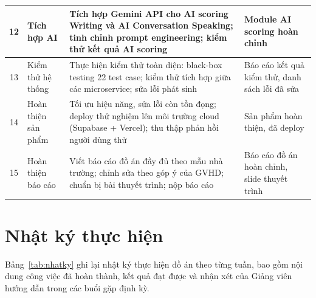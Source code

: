 \documentclass[a4paper,12pt]{extreport}
\begin{document}
\begin{longtable}{|c|p{4.0cm}|p{5.5cm}|p{3.5cm}|}
    12 & Tích hợp AI & Tích hợp Gemini API cho AI scoring Writing và AI Conversation Speaking; tinh chỉnh prompt engineering; kiểm thử kết quả AI scoring & Module AI scoring hoàn chỉnh \\ \hline
    13 & Kiểm thử hệ thống & Thực hiện kiểm thử toàn diện: black-box testing 22 test case; kiểm thử tích hợp giữa các microservice; sửa lỗi phát sinh & Báo cáo kết quả kiểm thử, danh sách lỗi đã sửa \\ \hline
    14 & Hoàn thiện sản phẩm & Tối ưu hiệu năng, sửa lỗi còn tồn đọng; deploy thử nghiệm lên môi trường cloud (Supabase + Vercel); thu thập phản hồi người dùng thử & Sản phẩm hoàn thiện, đã deploy \\ \hline
    15 & Hoàn thiện báo cáo & Viết báo cáo đồ án đầy đủ theo mẫu nhà trường; chỉnh sửa theo góp ý của GVHD; chuẩn bị bài thuyết trình; nộp báo cáo & Báo cáo đồ án hoàn chỉnh, slide thuyết trình \\ \hline
\end{longtable}

\chapter{Nhật ký thực hiện}
\label{app:nhatky}

Bảng~\ref{tab:nhatky} ghi lại nhật ký thực hiện đồ án theo từng tuần, bao gồm nội dung công việc đã hoàn thành, kết quả đạt được và nhận xét của Giảng viên hướng dẫn trong các buổi gặp định kỳ.
\end{document}
